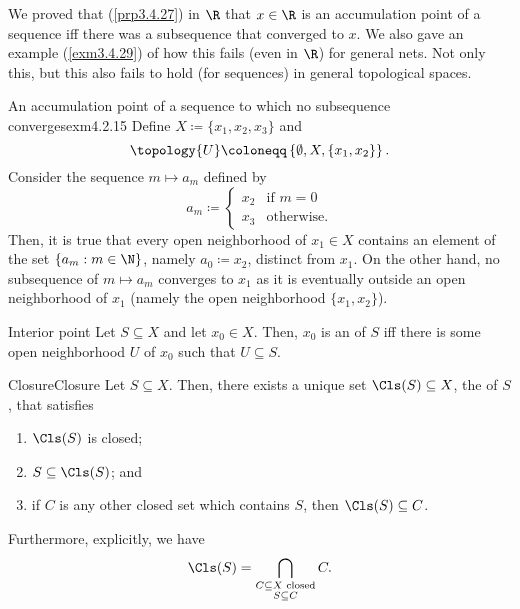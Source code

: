 We proved that (\cref{prp3.4.27}) in $\R$ that $x\in \R$ is an accumulation point of a sequence iff there was a subsequence that converged to $x$.  We also gave an example (\cref{exm3.4.29}) of how this fails (even in $\R$) for general nets.  Not only this, but this also fails to hold (for sequences) in general topological spaces.
\begin{exm}{An accumulation point of a sequence to which no subsequence converges}{exm4.2.15}
Define $X\coloneqq \{ x_1,x_2,x_3\}$ and
\begin{equation}
\topology{U}\coloneqq \left\{ \emptyset ,X,\{ x_1,x_2\} \right\} .
\end{equation}
Consider the sequence $m\mapsto a_m$ defined by
\begin{equation}
a_m\coloneqq \begin{cases}x_2 & \text{if }m=0 \\ x_3 & \text{otherwise.}\end{cases}
\end{equation}
Then, it is true that every open neighborhood of $x_1\in X$ contains an element of the set $\{ a_m:m\in \N \}$, namely $a_0\coloneqq x_2$, distinct from $x_1$.  On the other hand, no subsequence of $m\mapsto a_m$ converges to $x_1$ as it is eventually outside an open neighborhood of $x_1$ (namely the open neighborhood $\{ x_1,x_2\}$).
\end{exm}
\begin{dfn}{Interior point}{}
Let $S\subseteq X$ and let $x_0\in X$.  Then, $x_0$ is an  of $S$ iff there is some open neighborhood $U$ of $x_0$ such that $U\subseteq S$.
\end{dfn}
\begin{prp}{Closure}{Closure}
Let $S\subseteq X$.  Then, there exists a unique set $\Cls (S)\subseteq X$, the  of $S$, that satisfies
\begin{enumerate}
\item $\Cls (S)$ is closed;
\item $S\subseteq \Cls (S)$; and
\item if $C$ is any other closed set which contains $S$, then $\Cls (S)\subseteq C$.
\end{enumerate}
Furthermore, explicitly, we have
\begin{equation}
\Cls (S)=\bigcap _{\substack{C\subseteq X\text{ closed} \\ S\subseteq C}}C.
\end{equation}
\end{prp}
